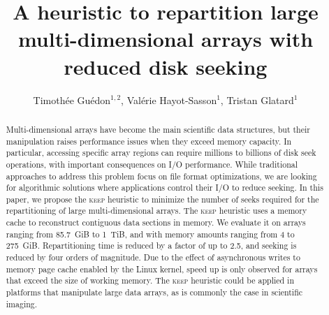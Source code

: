 \documentclass[sigconf, nonacm]{acmart}
\newcommand{\keep}[0]{\textsc{keep}\xspace}
\begin{document}
\title{A heuristic to repartition large multi-dimensional arrays with reduced disk seeking}

\author{Timoth\'ee Gu\'edon$^{1,2}$, Val\'erie Hayot-Sasson$^1$, Tristan Glatard$^1$}


\begin{abstract}
Multi-dimensional arrays have become the main scientific data structures,
but their manipulation raises performance issues when they exceed memory
capacity. In particular, accessing specific array regions can require
millions to billions of disk seek operations, with important consequences
on I/O performance. While traditional approaches to address this problem
focus on file format optimizations, we are looking for algorithmic
solutions where applications control their I/O to reduce
seeking. In this paper, we propose the \keep heuristic to minimize the
number of seeks required for the repartitioning of large multi-dimensional
arrays. The \keep heuristic uses a memory cache to reconstruct contiguous
data sections in memory. We evaluate it on arrays ranging from 85.7~GiB to
1~TiB, and with memory amounts ranging from 4 to 275~GiB. Repartitioning
time is reduced by a factor of up to 2.5, and seeking is reduced by four orders
of magnitude. Due to the effect of asynchronous writes to memory page cache
enabled by the Linux kernel, speed up is only observed for arrays that
exceed the size of working memory. The \keep heuristic could be applied in
platforms that manipulate large data arrays, as is commonly the case in
scientific imaging.
\end{abstract}

\listoffixmes

\newpage

\maketitle
\end{document}
